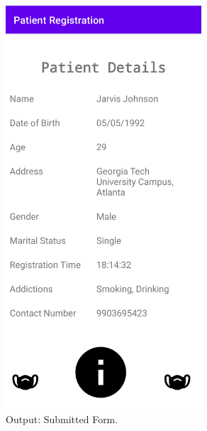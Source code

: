 \documentclass[12pt, a4]{article}
\begin{document}
\subsection*{}
\begin{figure}[h]
\centering
\caption{Output: Submitted Form.}
\includegraphics[height=15cm, width=7.3cm]{PatientRegistration/Screenshots/SubmittedForm.png}
\end{figure}

\newpage
\end{document}
